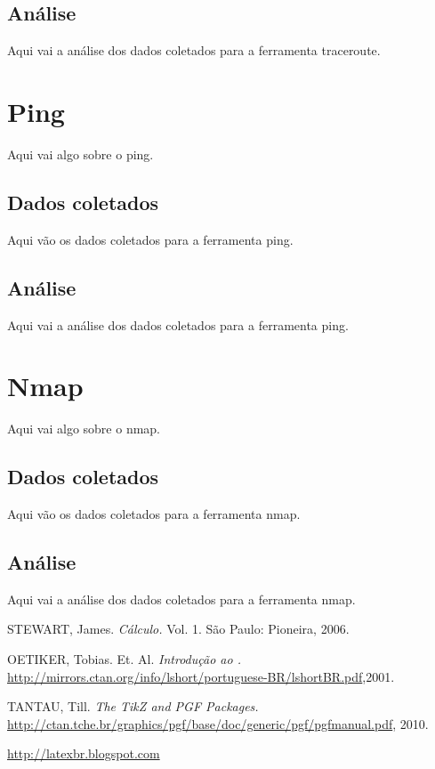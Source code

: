 \documentclass[a4paper]{report} %
\begin{document}
\subsection{Análise}
\label{sub_traceroute_analise}
Aqui vai a análise dos dados coletados para a ferramenta traceroute.

\section{Ping}
\label{sec_ping}
Aqui vai algo sobre o ping.
\subsection{Dados coletados}
\label{sub_ping_dados}
Aqui vão os dados coletados para a ferramenta ping.

\subsection{Análise}
\label{sub_ping_analise}
Aqui vai a análise dos dados coletados para a ferramenta ping.

\section{Nmap}
\label{sec_nmap}
Aqui vai algo sobre o nmap.
\subsection{Dados coletados}
\label{sub_nmap_dados}
Aqui vão os dados coletados para a ferramenta nmap.

\subsection{Análise}
\label{sub_nmap_analise}
Aqui vai a análise dos dados coletados para a ferramenta nmap.

\begin{thebibliography}{99}
 STEWART, James. {\sl C\'alculo.} Vol. 1. S\~ao Paulo: Pioneira, 2006.

OETIKER, Tobias. Et. Al. {\sl Introdu\c c\~ao ao {\LaTeXe}.}
\url{http://mirrors.ctan.org/info/lshort/portuguese-BR/lshortBR.pdf},2001.

TANTAU, Till. {\sl The TikZ and PGF Packages.}
\url{http://ctan.tche.br/graphics/pgf/base/doc/generic/pgf/pgfmanual.pdf}, 2010.

\url{http://latexbr.blogspot.com}
\end{thebibliography}

\end{document}
